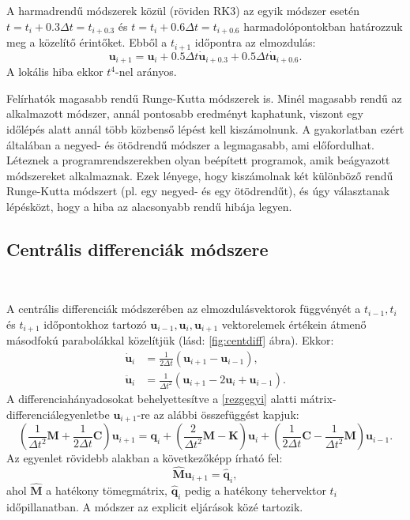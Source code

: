  A harmadrendű módszerek közül  (röviden RK3) az egyik módszer esetén $t = t_{i}+0.3\Delta{t} = t_{i+0.3}$ és $t = t_{i}+0.6\Delta{t} = t_{i+0.6}$ harmadolópontokban határozzuk meg a közelítő érintőket. Ebből a $t_{i+1}$ időpontra az elmozdulás:
\begin{equation*}
\mathbf{u}_{i+1} = \mathbf{u}_i+0.5\Delta{t}\mathbf{\dot{u}}_{i+0.3}+0.5\Delta{t}\mathbf{\dot{u}}_{i+0.6}.
\end{equation*}
A lokális hiba ekkor $t^4$-nel arányos.

Felírhatók magasabb rendű Runge-Kutta módszerek is. Minél magasabb rendű az alkalmazott módszer, annál pontosabb eredményt kaphatunk, viszont egy időlépés alatt annál több közbenső lépést kell kiszámolnunk. A gyakorlatban ezért általában a negyed- és ötödrendű módszer a legmagasabb, ami előfordulhat. Léteznek a programrendszerekben olyan beépített programok, amik  beágyazott módszereket alkalmaznak. Ezek lényege, hogy  kiszámolnak két különböző rendű Runge-Kutta módszert (pl. egy negyed- és egy ötödrendűt), és úgy választanak lépésközt, hogy a hiba az alacsonyabb rendű hibája legyen.

\subsection{Centrális differenciák módszere}

{\ }

A centrális differenciák módszerében \cite{gyorgyi} az elmozdulásvektorok függvényét a $t_{i-1}, t_i$ és $t_{i+1}$ időpontokhoz tartozó $\mathbf{u}_{i-1}, \mathbf{u}_i, \mathbf{u}_{i+1}$ vektorelemek értékein átmenő másodfokú parabolákkal közelítjük (lásd: \ref{fig:centdiff} ábra). Ekkor:
%
\begin{align*}
\label{centdiff_av}
\mathbf{\dot{u}}_i&=\frac{1}{2\Delta{t}}\left(\mathbf{u}_{i+1}-\mathbf{u}_{i-1}\right), \\
\mathbf{\ddot{u}}_i&=\frac{1}{\Delta{t}^2}\left(\mathbf{u}_{i+1}-2\mathbf{u}_i+\mathbf{u}_{i-1}\right).
\end{align*}
%
A differenciahányadosokat behelyettesítve a \eqref{rezgegyi} alatti mátrix-differenciálegyenletbe $\mathbf{u}_{i+1}$-re az alábbi összefüggést kapjuk:
%
\begin{equation}
\label{centdiff long}
\left(\frac{1}{\Delta{t}^2}\mathbf{M}+\frac{1}{2\Delta{t}}\mathbf{C}\right)\mathbf{u}_{i+1} = \mathbf{q}_{i}+\left(\frac{2}{\Delta{t}^2}\mathbf{M}- \mathbf{K}\right)\mathbf{u}_i+\left(\frac{1}{2\Delta{t}}\mathbf{C}-\frac{1}{\Delta{t}^2}\mathbf{M}\right)\mathbf{u}_{i-1}.
\end{equation}
%
Az egyenlet rövidebb alakban a következőképp írható fel:
\begin{equation}
\label{centdiff short}
\mathbf{\hat{M}}\mathbf{u}_{i+1} = \mathbf{\hat{q}}_i,
\end{equation}
%
ahol $\mathbf{\hat{M}}$ a hatékony tömegmátrix, $\mathbf{\hat{q}}_i$ pedig a hatékony tehervektor $t_i$ időpillanatban. A módszer az explicit eljárások közé tartozik.

